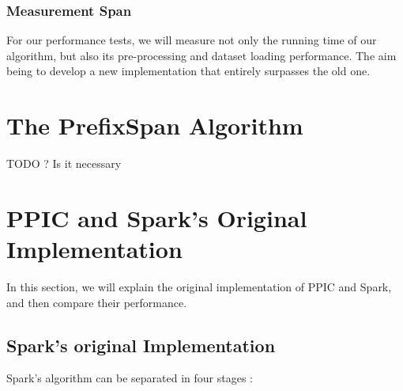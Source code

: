 \documentclass{eplmastersthesis}
\begin{document}
\subsubsection{Measurement Span}

For our performance tests, we will measure not only the running time of our algorithm, but also its pre-processing and dataset loading performance. The aim being to develop a new implementation that entirely surpasses the old one.

\section{The PrefixSpan Algorithm}

TODO ? Is it necessary

\section{PPIC and Spark's Original Implementation}

In this section, we will explain the original implementation of PPIC and Spark, and then compare their performance.

\subsection{Spark's original Implementation}

Spark's algorithm can be separated in four stages :
\end{document}
